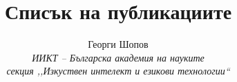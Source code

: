 \documentclass[a4paper,12pt]{article}
\title{\textbf{Списък на публикациите}}
\date{}
\author{
	Георги Шопов \\
	\textit{ИИКТ -- Българска академия на науките} \\
	\textit{секция ,,Изкуствен интелект и езикови технологии``}
}
\begin{document}
	\maketitle
	\nocite{*}
	\printbibliography
\end{document}
